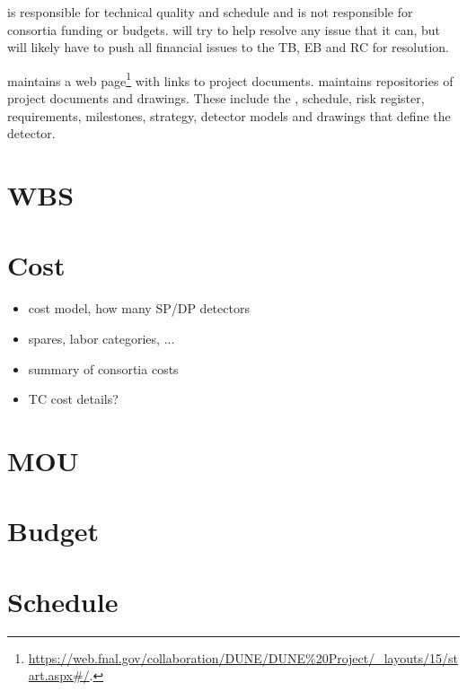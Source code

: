  is responsible for technical quality and schedule and is not
responsible for consortia funding or budgets.   will try to help
resolve any issue that it can, but will likely have to push all
financial issues to the TB, EB and RC for resolution.

 maintains a web
page\footnote{\url{https://web.fnal.gov/collaboration/DUNE/DUNE\%20Project/\_layouts/15/start.aspx\#/}.}
with links to project documents.  maintains repositories of
project documents and drawings. These include the ,
schedule, risk register, requirements, milestones, strategy, detector
models and drawings that define the  detector.

\section{WBS}
\label{sec:fdsp-coord-wbs}

\section{Cost}
\label{sec:fdsp-coord-cost}

\begin{itemize}
 \item cost model, how many SP/DP detectors
 \item spares, labor categories, ...
 \item summary of consortia costs
 \item TC cost details?
\end{itemize}

\section{MOU}
\label{sec:fdsp-coord-mou}

\section{Budget}
\label{sec:fdsp-coord-budget}

\section{Schedule}
\label{sec:fdsp-coord-controls}

